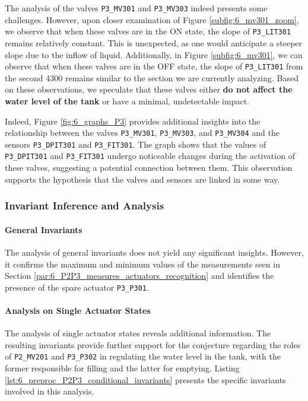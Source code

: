 The analysis of the valves \texttt{P3\_MV301} and \texttt{P3\_MV303} indeed presents some challenges. However, upon closer examination of Figure \ref{subfig:6_mv301_zoom}, we observe that when these valves are in the ON state, the slope of \texttt{P3\_LIT301} remains relatively constant. This is unexpected, as one would anticipate a steeper slope due to the inflow of liquid. Additionally, in Figure \ref{subfig:6_mv301}, we can observe that when these valves are in the OFF state, the slope of \texttt{P3\_LIT301} from the second 4300 remains similar to the section we are currently analyzing. Based on these observations, we speculate that these valves either \textbf{do not affect the water level of the tank} or have a minimal, undetectable impact.

\bigskip
Indeed, Figure \ref{fig:6_graphs_P3} provides additional insights into the relationship between the valves \texttt{P3\_MV301}, \texttt{P3\_MV303}, and \texttt{P3\_MV304} and the sensors \texttt{P3\_DPIT301} and \texttt{P3\_FIT301}. The graph shows that the values of \texttt{P3\_DPIT301} and \texttt{P3\_FIT301} undergo noticeable changes during the activation of these valves, suggesting a potential connection between them. This observation supports the hypothesis that the valves and sensors are linked in some way.

\subsubsection{Invariant Inference and Analysis}
\label{subsubsec:6_P2P3_invariants}

\paragraph{General Invariants}
\label{par:6_P2P3_general_invariant}

The analysis of general invariants does not yield any significant insights. However, it confirms the maximum and minimum values of the measurements seen in Section \ref{par:6_P2P3_measures_actuators_recognition} and identifies the presence of the spare actuator \texttt{P3\_P301}. 

\paragraph{Analysis on Single Actuator States}
\label{par:6_P2P3_single_act_states}
The analysis of single actuator states reveals additional information. The resulting invariants provide further support for the conjecture regarding the roles of \texttt{P2\_MV201} and \texttt{P3\_P302} in regulating the water level in the tank, with the former responsible for filling and the latter for emptying. Listing \ref{lst:6_preproc_P2P3_conditional_invariants} presents the specific invariants involved in this analysis.

